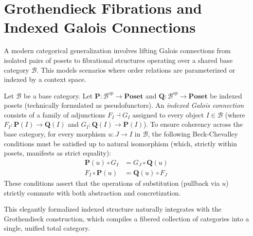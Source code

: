 \section{Grothendieck Fibrations and Indexed Galois Connections}

A modern categorical generalization involves lifting Galois connections from isolated pairs of posets to fibrational structures operating over a shared base category $\mathcal{B}$. This models scenarios where order relations are parameterized or indexed by a context space.

\begin{definition}
Let $\mathcal{B}$ be a base category. Let $\mathbf{P}: \mathcal{B}^{op} \to \mathbf{Poset}$ and $\mathbf{Q}: \mathcal{B}^{op} \to \mathbf{Poset}$ be indexed posets (technically formulated as pseudofunctors). An \emph{indexed Galois connection} consists of a family of adjunctions $F_I \dashv G_I$ assigned to every object $I \in \mathcal{B}$ (where $F_I: \mathbf{P}(I) \to \mathbf{Q}(I)$ and $G_I: \mathbf{Q}(I) \to \mathbf{P}(I)$). 
To ensure coherency across the base category, for every morphism $u: J \to I$ in $\mathcal{B}$, the following Beck-Chevalley conditions must be satisfied up to natural isomorphism (which, strictly within posets, manifests as strict equality):
\begin{align}
\label{eq:beck_chevalley_1}
\mathbf{P}(u) \circ G_I &= G_J \circ \mathbf{Q}(u) \\
\label{eq:beck_chevalley_2}
F_I \circ \mathbf{P}(u) &= \mathbf{Q}(u) \circ F_J
\end{align}
These conditions assert that the operations of substitution (pullback via $u$) strictly commute with both abstraction and concretization.
\end{definition}

This elegantly formalized indexed structure naturally integrates with the Grothendieck construction, which compiles a fibered collection of categories into a single, unified total category.

